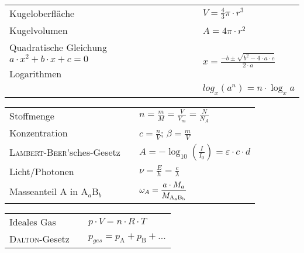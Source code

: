 \documentclass[./main.tex]{subfiles}
\begin{document}
\begin{formulabox}[Mathematik]
  \begin{center}
  \renewcommand{\arraystretch}{1.4}
    \begin{tabular}{>{\raggedleft\arraybackslash}p{} p{}p{}}
       Kugeloberfl\"ache & & $V=\frac{4}{3}\pi\cdot r^3$ \\
       Kugelvolumen & & $A=4\pi\cdot r^2$ \\
       Quadratische Gleichung $a\cdot x^2 + b\cdot x + c = 0$ & & \multirow{2}{*}{$\displaystyle x = \frac{-b\pm\sqrt{b^2-4\cdot a\cdot c}}{2\cdot a}$}\\
       Logarithmen & & $\log_x(a\cdot b) = \log_x a + \log_x b$\\
       & & $log_x(a^n) = n\cdot \log_x a$
    \end{tabular}
  \end{center}
\end{formulabox}

\begin{formulabox}
  \begin{center}
  \renewcommand{\arraystretch}{1.8}
    \begin{tabular}{>{\raggedleft\arraybackslash}p{} p{}p{}}
        Stoffmenge & & $\displaystyle n = \frac{m}{M} = \frac{V}{V_m} = \frac{N}{N_A}$\\
        Konzentration & & $\displaystyle c = \frac{n}{V}$; $\displaystyle \beta = \frac{m}{V}$\\
        \textsc{Lambert}-\textsc{Beer}'sches-Gesetz & & $\displaystyle A = -\log_{10}{\left(\frac{I}{I_0}\right)} = \varepsilon \cdot c \cdot d$ \\
        Licht/Photonen & & $\displaystyle \nu = \frac{E}{h} = \frac{c}{\lambda}$ \\
        Masseanteil A in A$_a$B$_b$ & & $\displaystyle \omega_A = \frac{a \cdot M_a}{M_{\text{A\textsubscript{a}B\textsubscript{b}}}}$
    \end{tabular}
  \end{center}
\end{formulabox}

\begin{formulabox}[Gase]
  \begin{center}
  \renewcommand{\arraystretch}{1.4}
    \begin{tabular}{>{\raggedleft\arraybackslash}p{} p{}p{}}
        Ideales Gas & & $p \cdot V = n \cdot R \cdot T$\\
        \textsc{Dalton}-Gesetz & & $p_{ges} = p_\text{A} + p_\text{B} + ... $\\
    \end{tabular}
  \end{center}
\end{formulabox}
\end{document}
